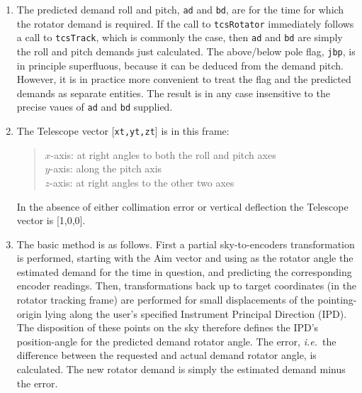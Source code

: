 \documentclass[12pt,fleqn,twoside]{article}
\renewcommand{\_}{{\tt\char'137}}     %
\begin{document}
{\begin{enumerate}
      In the present case, virtual telescope techniques are used to project
      from the focal plane to the sky and thereby establish the field
      orientation.
\item The predicted demand roll and pitch,
      {\tt ad} and {\tt bd}, are for the time
      for which the rotator demand is required.  If the call to
      {\tt tcsRotator} immediately follows
      a call to {\tt tcsTrack}, which is
      commonly the case, then {\tt ad} and {\tt bd}
      are simply the roll and pitch
      demands just calculated.  The above/below pole flag,
      {\tt jbp}, is in
      principle superfluous, because it can be deduced from the demand
      pitch.  However, it is in practice more convenient to treat the
      flag and the predicted demands as separate entities.  The result
      is in any case insensitive to the precise vaues of
      {\tt ad} and {\tt bd} supplied.
\item The {\sc Telescope} vector [{\tt xt,yt,zt}] is in this frame:
      \begin{quote}
      $x$-axis:  at right angles to both the roll and pitch axes \\
      $y$-axis:  along the pitch axis \\
      $z$-axis:  at right angles to the other two axes
      \end{quote}
      In the absence of either collimation error or vertical deflection
      the {\sc Telescope} vector is [1,0,0].
\item The basic method is as follows.  First a partial sky-to-encoders
      transformation is performed, starting with the {\sc Aim} vector and
      using as the rotator angle the estimated demand for the time in
      question, and predicting the corresponding encoder readings.
      Then, transformations back up to target coordinates (in the
      rotator tracking frame) are performed for small displacements
      of the pointing-origin lying along the user's specified
      Instrument Principal Direction (IPD).  The disposition of these
      points on the sky therefore defines the IPD's position-angle for
      the predicted demand rotator angle.  The error, {\it i.e.}~the
      difference between the requested and actual demand rotator angle,
      is calculated.  The new rotator demand is simply the estimated
      demand minus the error.


\end{enumerate}}
\end{document}
